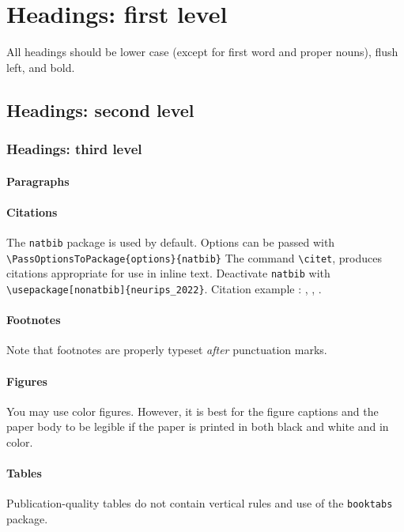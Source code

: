\section{Headings: first level}
\label{sec:headings}

All headings should be lower case (except for first word and proper nouns),
flush left, and bold.

\subsection{Headings: second level}

\subsubsection{Headings: third level}

\paragraph{Paragraphs}

\paragraph{Citations}
The \verb+natbib+ package is used by default. 
Options can be passed with \verb+\PassOptionsToPackage{options}{natbib}+
The command \verb+\citet+, produces citations appropriate for
use in inline text.
Deactivate \verb+natbib+ with \verb+\usepackage[nonatbib]{neurips_2022}+.
Citation example : \cite{tropp2010computational}, \citet{tropp2010computational}, \citeyear{tropp2010computational}.

\paragraph{Footnotes}
Note that footnotes are properly typeset \emph{after} punctuation
marks.

\paragraph{Figures}
You may use color figures. 
However, it is best for the figure captions and the paper body to be legible if the paper is printed in both black and white and in color.


\paragraph{Tables}
Publication-quality tables do not contain vertical rules and use of the \verb+booktabs+ package.
